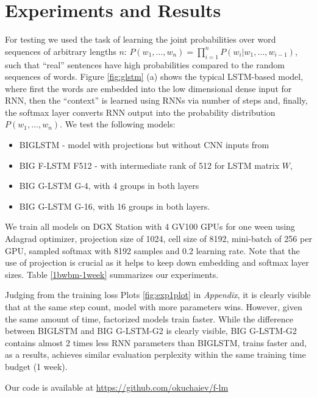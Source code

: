 \documentclass{article} \usepackage{iclr2017_workshop,times}
\begin{document}
\section{Experiments and Results} \label{expsection}

For testing we used the task of learning the joint probabilities over word sequences of arbitrary lengths $n$: 
$
P(w_1,...,w_n)=\prod_{i=1}^{n}P(w_i|w_1,...,w_{i-1})
$, such that ``real'' sentences have high probabilities compared to the random sequences of words. Figure \ref{fig:glstm} (a) shows the typical LSTM-based model, where first the words are embedded into the low dimensional dense input for RNN, then the ``context'' is learned using RNNs via number of steps and, finally, the softmax layer converts RNN output into the probability distribution $P(w_1,...,w_n)$.
We test the following models: 
\begin{itemize} 
\item BIGLSTM -  model with projections but without CNN inputs from \citet{jozefowicz2016exploring}
\item BIG F-LSTM F512 - with intermediate rank of 512 for LSTM matrix $W$, \item BIG G-LSTM G-4, with 4 groups in both layers 
\item BIG G-LSTM G-16,  with 16 groups in both layers. 
\end{itemize} 

We train all models on DGX Station with 4 GV100 GPUs for one ween using Adagrad optimizer, projection size of 1024, cell size of 8192, mini-batch of 256 per GPU, sampled softmax with 8192 samples and 0.2 learning rate. Note that the use of projection is crucial as it helps to keep down embedding and softmax layer sizes. Table \ref{1bwbm-1week} summarizes our experiments. 

 
Judging from the training loss Plots  \ref{fig:exp1plot} in \textit{Appendix}, it is clearly visible that at the same step count, model with more parameters wins. However, given the same amount of time, factorized models train faster. While the difference between BIGLSTM and BIG G-LSTM-G2 is clearly visible, BIG G-LSTM-G2 contains almost 2 times less RNN parameters than BIGLSTM, trains faster and, as a results, achieves similar evaluation perplexity within the same training time budget (1 week). 


Our code is available at \url{https://github.com/okuchaiev/f-lm} 
\end{document}
